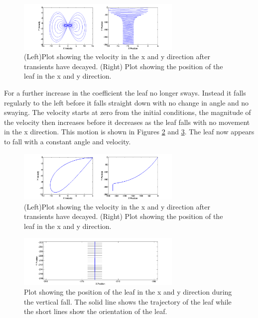 \begin{figure}[H]
\centering
\includegraphics[width=0.7\textwidth]{Motion_Graphs/Motion4.png}
\caption{\label{fig:Motion4}(Left)Plot showing the velocity in the x and y direction after transients have decayed. (Right) Plot showing the position of the leaf in the x and y direction.
}
\end{figure}

For a further increase in the coefficient the leaf no longer sways. Instead it falls regularly to the left before it falls straight down with no change in angle and no swaying. The velocity starts at zero from the initial conditions, the magnitude of the velocity then increases before it decreases as the leaf falls with no movement in the x direction. This motion is shown in Figures \ref{fig:Motion5} and \ref{fig:Motion6}. The leaf now appears to fall with a constant angle and velocity. 

\begin{figure}[H]
\centering
\includegraphics[width=0.7\textwidth]{Motion_Graphs/Motion5.png}
\caption{\label{fig:Motion5}(Left)Plot showing the velocity in the x and y direction after transients have decayed. (Right) Plot showing the position of the leaf in the x and y direction.
}
\end{figure}

\begin{figure}[H]
\centering
\includegraphics[width=0.7\textwidth]{Motion_Graphs/Motion6.png}
\caption{\label{fig:Motion6}Plot showing the position of the leaf in the x and y direction during the vertical fall. The solid line shows the trajectory of the leaf while the short lines show the orientation of the leaf.
}
\end{figure}



